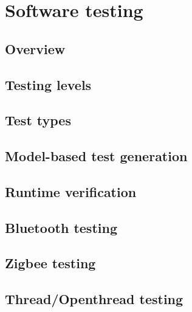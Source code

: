 \chapter{Software testing}
\label{chap:testing}
\section{Overview}

\section{Testing levels}

\section{Test types}

\section{Model-based test generation}

\section{Runtime verification}

\section{Bluetooth testing}

\section{Zigbee testing}

\section{Thread/Openthread testing}